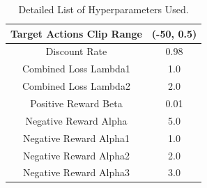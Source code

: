 \begin{table}[h!]
\begin{tabular}{|c|c|}
Target Actions Clip Range             & (-50, 0.5)                      \\ \hline
Discount Rate                         & 0.98                            \\ \hline
Combined Loss Lambda1                 & 1.0                             \\ \hline
Combined Loss Lambda2                 & 2.0                             \\ \hline
Positive Reward Beta                  & 0.01                            \\ \hline
Negative Reward Alpha                 & 5.0                             \\ \hline
Negative Reward Alpha1                & 1.0                             \\ \hline
Negative Reward Alpha2                & 2.0                             \\ \hline
Negative Reward Alpha3                & 3.0                             \\ \hline
\end{tabular}
\caption{Detailed List of Hyperparameters Used.}
\label{tab:my-table}
\end{table}
